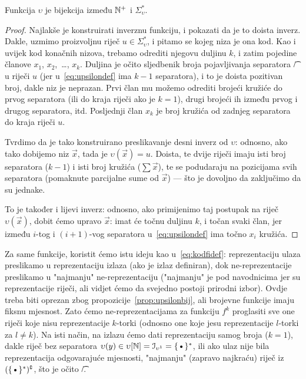 \begin{propozicija}\label{prop:upsilonbij}
Funkcija $\upsilon$ je bijekcija između ${\mathbb N}^+$ i $\Sigma_\upsilon^*$.
\end{propozicija}
\begin{proof}
Najlakše je konstruirati inverznu funkciju, i pokazati da je to doista inverz. Dakle, uzmimo proizvoljnu riječ $u\in\Sigma_\upsilon^*$, i pitamo se kojeg niza je ona kod. Kao i uvijek kod konačnih nizova, trebamo odrediti njegovu duljinu $k$, i zatim pojedine članove $x_1$, $x_2$,~\ldots, $x_k$. Duljina je očito sljedbenik broja pojavljivanja separatora \t/ u riječi $u$ (jer u~\eqref{eq:upsilondef} ima $k-1$ separatora), i to je doista pozitivan broj, dakle niz je neprazan. Prvi član mu možemo odrediti brojeći kružiće do prvog separatora (ili do kraja riječi ako je $k=1$), drugi brojeći ih između prvog i drugog separatora, itd. Posljednji član $x_k$ je broj kružića od zadnjeg separatora do kraja riječi $u$.

Tvrdimo da je tako konstruirano preslikavanje desni inverz od $\upsilon$: odnosno, ako tako dobijemo niz $\vec x$, tada je $\upsilon(\vec x)=u$. Doista, te dvije riječi imaju isti broj separatora ($k-1$) i isti broj kružića ($\sum\vec x$), te se podudaraju na pozicijama svih separatora (pomaknute parcijalne sume od $\vec x$) --- što je dovoljno da zaključimo da su jednake.

To je također i lijevi inverz: odnosno, ako primijenimo taj postupak na riječ $\upsilon(\vec x)$, dobit ćemo upravo $\vec x$: imat će točnu duljinu $k$, i točan svaki član, jer između $i$-tog i $(i+1)$-vog separatora u~\eqref{eq:upsilondef} ima točno $x_i$ kružića.
\end{proof}

Za same funkcije, koristit ćemo istu ideju kao u~\eqref{eq:kodfidef}: reprezentaciju ulaza preslikamo u reprezentaciju izlaza (ako je izlaz definiran), dok ne-reprezentacije preslikamo u "najmanju" ne-reprezentaciju ("najmanju" je pod navodnicima jer su reprezentacije riječi, ali vidjet ćemo da svejedno postoji prirodni izbor). Ovdje treba biti oprezan zbog propozicije~\ref{prop:upsilonbij}, ali brojevne funkcije imaju fiksnu mjesnost. Zato ćemo ne-reprezentacijama za funkciju $f^k$ proglasiti sve one riječi koje nisu reprezentacije $k$-torki (odnosno one koje jesu reprezentacije $l$-torki za $l\not=k$). Na isti način, na izlazu ćemo dati reprezentaciju samog broja ($k=1$), dakle riječ bez separatora $\upsilon(y)\in\upsilon[\N]=\im{\upsilon^1}=\{\text\textbullet\}^*$, ili ako ulaz nije bila reprezentacija odgovarajuće mjesnosti, "najmanju" (zapravo najkraću) riječ iz $(\{\text\textbullet\}^*)\kompl$, što je očito \t/.

